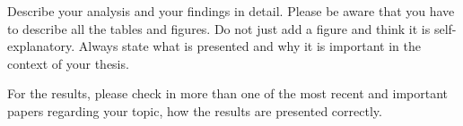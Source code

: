 Describe your analysis and your findings in detail. Please be aware that you have to describe all the tables and figures. Do not just add a figure and think it is self-explanatory. Always state what is presented and why it is important in the context of your thesis. 

For the results, please check in more than one of the most recent and important papers regarding your topic, how the results are presented correctly. 

